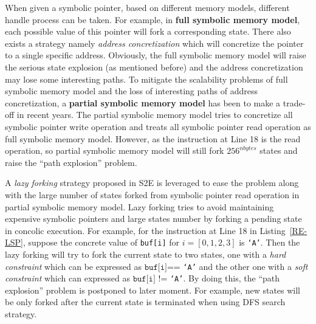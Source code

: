 When given a symbolic pointer, based on different memory models, different handle process can be taken. For example, in \textbf{full symbolic memory model}, each possible value of this pointer will fork a corresponding state. There also exists a strategy namely \textit{address concretization} which will concretize the pointer to a single specific address. Obviously, the full symbolic memory model will raise the serious state explosion (as mentioned before) and the address concretization may lose some interesting paths. To mitigate the scalability problems of full symbolic memory model and the loss of interesting paths of address concretization, a \textbf{partial symbolic memory model} has been to make a trade-off in recent years. The partial symbolic memory model tries to concretize all symbolic pointer write operation and treats all symbolic pointer read operation as full symbolic memory model. However, as the instruction at Line 18 is the read operation, so partial symbolic memory model will still fork $256^{nbytes}$ states and raise the ``path explosion'' problem.

A \textit{lazy forking} strategy proposed in S2E is leveraged to ease the problem along with the large number of states forked from symbolic pointer read operation in partial symbolic memory model. 
Lazy forking tries to avoid maintaining expensive symbolic pointers and large states number by forking a pending state in concolic execution. 
For example, for the instruction at Line 18 in Listing~\ref{RE-LSP}, suppose the concrete value of \texttt{buf[i]} for $i=[0,1,2,3]$ is \texttt{`A'}. Then the lazy forking will try to fork the current state to two states, one with a \textit{hard constraint} which can be expressed as $\texttt{buf[i]}$== \texttt{`A'} and the other one with a \textit{soft constraint} which can expressed as $\texttt{buf[i]}$ != \texttt{`A'}.
By doing this, the ``path explosion'' problem is postponed to later moment. For example, new states will be only forked after the current state is terminated when using DFS search strategy.


